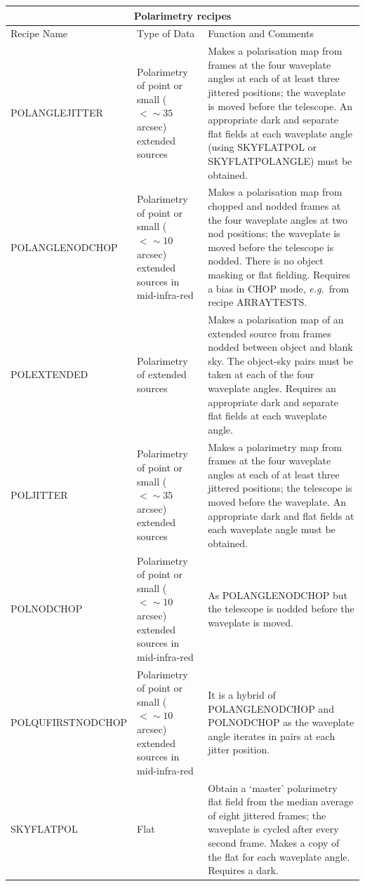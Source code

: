 \documentclass[twoside,11pt]{article}
\newcommand{\htmlref}[2]{#1}
\renewcommand{\_}{\texttt{\symbol{95}}}
\begin{document}
\begin{center}
\begin{tabular}{|p{48mm}|p{29mm}|p{74mm}|}
\multicolumn{3}{c}{\large{\bf Polarimetry recipes}} \vspace*{1ex} \\
\hline
Recipe Name & Type of Data & Function and Comments \\ \hline
\htmlref{POL\_ANGLE\_JITTER}{POL\_ANGLE\_JITTER} & 
   Polarimetry of point or small ($<\sim35$ arcsec) extended sources &
   Makes a polarisation map from frames at the four waveplate angles at
   each of at least three jittered positions; the waveplate is moved
   before the telescope.  An appropriate dark and separate flat fields
   at each waveplate angle (using SKY\_FLAT\_POL or SKY\_FLAT\_POL\_ANGLE)
   must be obtained. \\ \hline
\htmlref{POL\_ANGLE\_NOD\_CHOP}{POL\_ANGLE\_NOD\_CHOP} & 
   Polarimetry of point or small ($<\sim10$ arcsec) extended sources in
   mid-infra-red &
   Makes a polarisation map from chopped and nodded frames at the four
   waveplate angles at two nod positions; the waveplate is moved before
   the telescope is nodded.  There is no object masking or flat fielding.
   Requires a bias in CHOP mode, {\em e.g.}\ from recipe ARRAY\_TESTS. \\ \hline
\htmlref{POL\_EXTENDED}{POL\_EXTENDED} &
   Polarimetry of extended sources &
   Makes a polarisation map of an extended source from frames
   nodded between object and blank sky.  The object-sky pairs
   must be taken at each of the four waveplate angles.  Requires
   an appropriate dark and separate flat fields at each waveplate
   angle. \\ \hline
\htmlref{POL\_JITTER}{POL\_JITTER} & 
   Polarimetry of point or small ($<\sim35$ arcsec) extended sources &
   Makes a polarimetry map from frames at the four waveplate angles at
   each of at least three jittered positions; the telescope is moved
   before the waveplate.  An appropriate dark and flat fields at each
   waveplate angle must be obtained.\\ \hline
\htmlref{POL\_NOD\_CHOP}{POL\_NOD\_CHOP} & 
   Polarimetry of point or small ($<\sim10$ arcsec) extended sources in
   mid-infra-red &
   As \htmlref{POL\_ANGLE\_NOD\_CHOP}{POL\_ANGLE\_NOD\_CHOP} but
   the telescope is nodded before the waveplate is moved.  \\ \hline
\htmlref{POL\_QU\_FIRST\_NOD\_\-CHOP}{POL\_QU\_FIRST\_NOD\_CHOP} & 
   Polarimetry of point or small ($<\sim10$ arcsec) extended sources in
   mid-infra-red &
   It is a hybrid of \htmlref{POL\_ANGLE\_NOD\_CHOP}{POL\_ANGLE\_NOD\_CHOP}
   and \htmlref{POL\_NOD\_CHOP}{POL\_NOD\_CHOP} as the waveplate angle
   iterates in pairs at each jitter position. \\ \hline
\htmlref{SKY\_FLAT\_POL}{SKY\_FLAT\_POL} & Flat &
   Obtain a `master' polarimetry flat field from the median average
   of eight jittered frames; the waveplate is cycled after
   every second frame.  Makes a copy of the flat for each
   waveplate angle.  Requires a dark.\\ \hline
\end{tabular}
\end{center}
\end{document}
